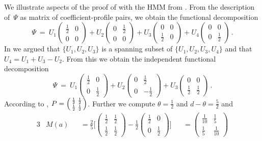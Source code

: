 \documentclass[a4paper,UKenglish,cleveref, autoref,mathscr]{lipics-v2019}
\newcommand{\1}{\mathbbm{1}}
\begin{document}
\begin{example}
We illustrate aspects of the proof of  with the HMM from .
From the description of~$\Psi$ as matrix of coefficient-profile pairs, we obtain the functional decomposition
\[
 \Psi \ = \
 U_1 \begin{pmatrix}\frac12&0\\0&0\end{pmatrix} +
 U_2 \begin{pmatrix}0&\frac12\\0&0\end{pmatrix} +
 U_3 \begin{pmatrix}0&0\\\frac12&0\end{pmatrix} +
 U_4 \begin{pmatrix}0&0\\0&\frac12\end{pmatrix}\,.
\]
In  we argued that $\{U_1, U_2, U_3\}$ is a spanning subset of $\{U_1, U_2, U_3, U_4\}$ and that $U_4 = U_1 + U_3 - U_2$.
From this we obtain the independent functional decomposition
\[
 \Psi \ = \
 U_1 \begin{pmatrix}\frac12&0\\0&\frac12\end{pmatrix} +
 U_2 \begin{pmatrix}0&\frac12\\0&-\frac12\end{pmatrix} +
 U_3 \begin{pmatrix}0&0\\\frac12&\frac12\end{pmatrix}\,.
\]
According to , $P = \begin{psmallmatrix}\frac12&\frac12\\\frac12&\frac12\end{psmallmatrix}$.
Further we compute $\theta = \frac12$ and $d - \theta = \frac52$ and
\begin{alignat*}{3}
& M(a) &&= \frac25 \Big[\begin{pmatrix}
\frac12&\frac12\\\frac12&\frac12
\end{pmatrix} - \frac12\begin{pmatrix}
\frac12&0\\0&\frac12
\end{pmatrix}\Big] && = \begin{pmatrix}
\frac1{10}&\frac15\\\frac15&\frac1{10}

\end{pmatrix}
\end{alignat*}
\end{example}
\end{document}
